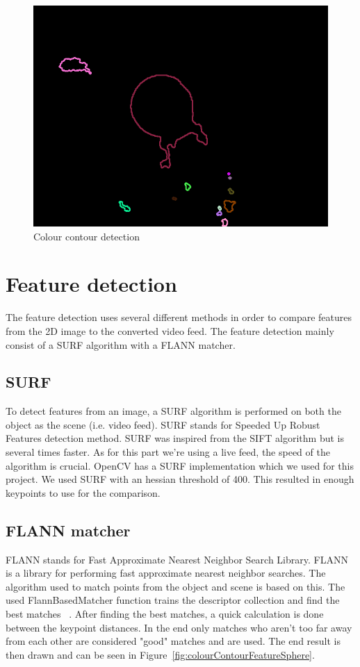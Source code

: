 \documentclass{report}
\begin{document}
\begin{figure}[h!]
\center
\includegraphics[width=.5\textwidth]{../images/colourContour_sphere.png}
\caption[]{Colour contour detection}
\label{fig:colourContourSphere}
\end{figure}

\section{Feature detection}
The feature detection uses several different methods in order to compare features from the 2D image to the converted video feed. The feature detection mainly consist of a SURF algorithm with a FLANN matcher.

\subsection{SURF}
To detect features from an image, a SURF algorithm is performed on both the object as the scene (i.e. video feed). SURF stands for Speeded Up Robust Features detection method. SURF was inspired from the SIFT algorithm but is several times faster. As for this part we're using a live feed, the speed of the algorithm is crucial. OpenCV has a SURF implementation which we used for this project. We used SURF with an hessian threshold of 400. This resulted in enough keypoints to use for the comparison.

\subsection{FLANN matcher}
FLANN stands for Fast Approximate Nearest Neighbor Search Library. FLANN is a library for performing fast approximate nearest neighbor searches. The algorithm used to match points from the object and scene is based on this. The used FlannBasedMatcher function trains the descriptor collection and find the best matches~\autocite{FlannBasedMatcher} . After finding the best matches, a quick calculation is done between the keypoint distances. In the end only matches who aren't too far away from each other are considered "good" matches and are used. The end result is then drawn and can be seen in Figure~\ref{fig:colourContourFeatureSphere}.
\end{document}
